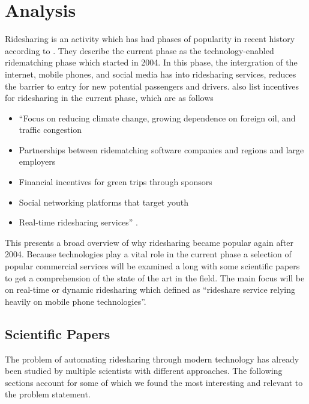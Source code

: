 \section{Analysis}
Ridesharing is an activity which has had phases of popularity in recent history according to \citet{doi:10.1080/01441647.2011.621557}.
They describe the current phase as the technology-enabled ridematching phase which started in 2004.
In this phase, the intergration of the internet, mobile phones, and social media has into ridesharing services, reduces the barrier to entry for new potential passengers and drivers.
\citet{doi:10.1080/01441647.2011.621557} also list incentives for ridesharing in the current phase, which are as follows 

\begin{itemize}
  \item ``Focus on reducing climate change, growing dependence on foreign oil, and traffic congestion
  \item Partnerships between ridematching software companies and regions and large employers
  \item Financial incentives for green trips through sponsors
  \item Social networking platforms that target youth
  \item Real-time ridesharing services'' \citep{doi:10.1080/01441647.2011.621557}.
\end{itemize}

This presents a broad overview of why ridesharing became popular again after 2004.
Because technologies play a vital role in the current phase a selection of popular commercial services will be examined a long with some scientific papers to get a comprehension of the state of the art in the field.
The main focus will be on real-time or dynamic ridesharing which \citet{amey2011real} defined as ``rideshare service relying heavily on mobile phone technologies''.

\subsection{Scientific Papers}
The problem of automating ridesharing through modern technology has already been studied by multiple scientists  with different approaches.
The following sections account for some of which we found the most interesting and relevant to the problem statement. 

